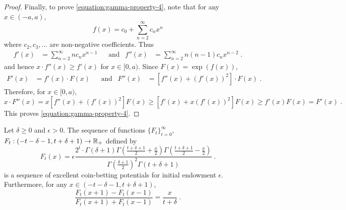 \begin{proof}
Finally, to prove \eqref{equation:gamma-property-4}, note that
for any $x \in (-a,a)$,
$$
f(x) = c_0 + \sum_{n=2}^\infty c_n x^n
$$
where $c_2, c_3, \dots$ are non-negative coefficients. Thus
\begin{align*}
f'(x) & = \sum_{n=2}^\infty n c_n x^{n-1} &
& \text{and} &
f''(x) & = \sum_{n=2}^\infty n (n-1) c_n x^{n-2} \; .
\end{align*}
and hence $x \cdot f''(x) \ge f'(x)$ for $x \in [0,a)$. Since $F(x) = \exp(f(x))$,
\begin{align*}
F'(x) & = f'(x) \cdot F(x) &
& \text{and} &
F''(x) & = \left[f''(x) + (f'(x))^2 \right] \cdot F(x) \; .
\end{align*}
Therefore, for $x \in [0,a)$,
$$
x \cdot F''(x)
= x \left[ f''(x) + (f'(x))^2 \right] F(x)
\ge \left[ f'(x) + x (f'(x))^2 \right] F(x)
\ge f'(x) F(x) = F'(x) \; .
$$
This proves \eqref{equation:gamma-property-4}.
\end{proof}

\begin{theorem}[KT potential]
\label{theorem:kt-potential}
Let $\delta \ge 0$ and $\epsilon > 0$. The sequence of functions
$\{F_t\}_{t=0}^\infty$, $F_t:(-t-\delta-1, t+\delta+1) \to \mathbb{R}_+$ defined by
$$
F_t(x) = \epsilon \frac{2^t \cdot \Gamma(\delta + 1) \Gamma(\frac{t+\delta+1}{2} + \frac{x}{2}) \Gamma(\frac{t+\delta+1}{2} - \frac{x}{2})}{\Gamma(\frac{\delta+1}{2})^2 \Gamma(t+\delta+1)} \; .
$$
is a sequence of excellent coin-betting potentials for initial endowment $\epsilon$.
Furthermore, for any $x \in (-t-\delta-1, t+\delta+1)$,
\begin{equation}
\label{equation:kt-potential-beta}
\frac{F_t(x+1) - F_{t}(x-1)}{F_t(x+1) + F_{t}(x-1)} = \frac{x}{t+\delta} \; .
\end{equation}
\end{theorem}

